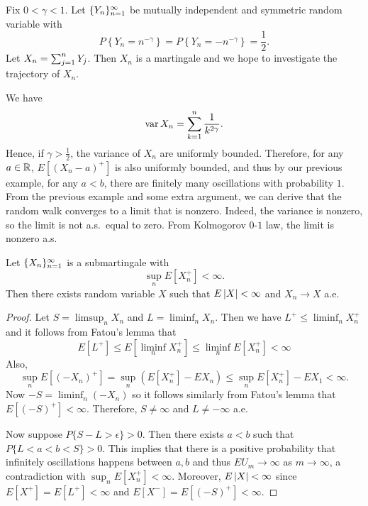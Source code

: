 \documentclass[a4paper]{article}
\begin{document}
\begin{eg}
  Fix $0 < \gamma < 1$.
  Let $\{ Y_n \}_{n=1}^\infty$ be mutually independent and symmetric
  random variable with
  \[
    P \left\{ Y_n = n^{-\gamma} \right\}
    = P \left\{ Y_n = - n^{-\gamma} \right\}
    = \frac{1}{2}.
  \]
  Let $X_n = \sum_{j=1}^n Y_j$. Then $X_n$ is a martingale and
  we hope to investigate the trajectory of $X_n$.

  We have
  \[
    \operatorname{var} X_n = \sum_{k=1}^n \frac{1}{k^{2 \gamma}}.
  \]
  Hence, if $\gamma > \frac{1}{2}$, the variance of $X_n$ are
  uniformly bounded. Therefore, for any $a \in \mathbb{R}$,
  $E [(X_n - a)^+]$ is also uniformly bounded, and thus
  by our previous example, for any $a < b$,
  there are finitely many oscillations with probability $1$.
  From the previous example and some extra argument,
  we can derive that the random walk converges to a limit that is nonzero.
  Indeed, the variance is nonzero, so the limit is not a.s.\ equal to zero.
  From Kolmogorov $0$-$1$ law, the limit is nonzero a.s.
\end{eg}

\begin{thm}
  Let $\{ X_n \}_{n=1}^\infty$ is a submartingale with
  \[
    \sup_n E[X_n^+] < \infty.
  \]
  Then there exists random variable $X$ such that
  $E \left\lvert X\right\rvert < \infty$ and $X_n \to X$ a.e.
\end{thm}

\begin{proof}
  Let $S = \limsup_n X_n$ and $L = \liminf_n X_n$.
  Then we have $L^+ \leq \liminf_n X_n^+$ and it follows from
  Fatou's lemma that
  \[
    E [L^+] \leq E[\liminf_n X_n^+] \leq \liminf_n E[X_n^+] < \infty
  \]
  Also,
  \[
    \sup_n E[(-X_n)^+] = \sup_n \left( E [X_n^+] - E X_n \right)
    \leq \sup_n E[X_n^+] - E X_1
    < \infty.
  \]
  Now $-S = \liminf_n (- X_n)$ so it follows similarly from
  Fatou's lemma that $E [(- S)^+] < \infty$. Therefore,
  $S \neq \infty$ and $L \neq - \infty$ a.e.

  Now suppose $P \{ S - L > \epsilon \} > 0$.
  Then there exists $a < b$ such that $P \{ L < a < b <
    S \} > 0$. This implies that there is a positive probability
  that infinitely oscillations happens between $a, b$ and thus
  $E U_m \to \infty$ as $m \to \infty$, a
  contradiction with $\sup_n E[X_n^+] < \infty$. Moreover,
  $E \left\lvert X\right\rvert < \infty$ since $E [X^+] = E [L^+] < \infty$
  and $E [X^-] = E [(-S)^+] < \infty$.

\end{proof}
\end{document}
